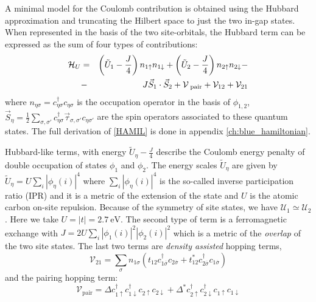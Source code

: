 A minimal model for the Coulomb contribution is obtained using the Hubbard approximation and truncating the Hilbert space to just the two in-gap states. When represented in the basis of the two site-orbitals, the Hubbard term can be expressed as the sum of four types of contributions\cite{Ortiz2019}:
\begin{eqnarray}
{\cal H}_{ U}&=& %
\left(\tilde{U}_1-\frac{J}{4}\right) n_{1\uparrow} n_{1\downarrow} +
\left(\tilde{U}_2 -\frac{J}{4}\right)
 n_{2\uparrow} n_{2\downarrow} 
 -\nonumber\\
&-& J \vec{S}_1\cdot\vec{S}_2+ {\cal V}_\text{ pair}+{\cal V}_{12}+ {\cal V}_{21}
\label{HAMIL}
\end{eqnarray}
where $n_{\eta\sigma}= c^{\dagger}_{\eta\sigma}c_{\eta\sigma}$ is the occupation operator in the basis of $\phi_{1,2}$, 
$\vec{S}_\eta= \frac{1}{2} \sum_{\sigma,\sigma'} c^{\dagger}_{\eta\sigma}\vec{\tau}_{\sigma,\sigma'}c_{\eta\sigma'}$ are the spin operators associated to these quantum states.
The full derivation of \eqref{HAMIL} is done in appendix \ref{ch:blue_hamiltonian}.


Hubbard-like terms, with energy $\tilde{U}_{\eta}-\frac{J}{4}$ describe the Coulomb energy penalty of double occupation of states $\phi_1$ and $\phi_2$. The energy scales $\tilde{U}_{\eta}$ are given by 
$\tilde{U}_{\eta}= U \sum_i |\phi_{\eta}(i)|^4$
where $\sum_i |\phi_{\eta}(i)|^4$ is the so-called inverse participation ratio (IPR) and it is a metric of the extension of the state\cite{Ortiz2019} and $U$ is the atomic carbon on-site repulsion. Because of the symmetry of site states, we have $\mathcal{U}_1\simeq\mathcal{U}_2$.
Here we take $U=|t|=\SI{2.7}{\eV}$. The second type of term is a ferromagnetic exchange
with 
$J= 2U \sum_i |\phi_{1}(i)|^2|\phi_{2}(i)|^2$
which is a metric of the \emph{overlap} of the two site states. 
The last two terms are \emph{density assisted} hopping terms, 
\begin{equation}
  \mathcal{V}_{21} = \sum_{\sigma} n_{1\sigma}
\left(
t_{12} c^{\dagger}_{1\overline{\sigma}} c_{2\overline{\sigma}}
+t_{12}^* c^{\dagger}_{2\overline{\sigma}} c_{1\overline{\sigma}} \right)
\end{equation}
and the pairing hopping term:
\begin{equation}
\mathcal{V}_\text{pair}=
\Delta c^{\dagger}_{1\uparrow} c^{\dagger}_{1\downarrow} c_{2\uparrow}c_{2\downarrow}
+ \Delta^* c^{\dagger}_{2\uparrow} c^{\dagger}_{2\downarrow} c_{1\uparrow}c_{1\downarrow} 
\end{equation}

